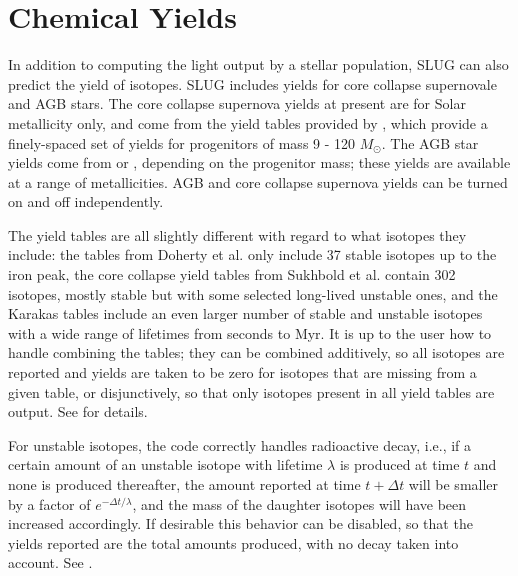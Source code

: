 \documentclass[letterpaper,10pt,english]{sphinxmanual}
\begin{document}
\section{Chemical Yields}
\label{\detokenize{intro:ssec-yields}}\label{\detokenize{intro:chemical-yields}}
In addition to computing the light output by a stellar population,
SLUG can also predict the yield of isotopes. SLUG includes yields for
core collapse supernovale and AGB stars. The core collapse supernova
yields at present are for Solar metallicity only, and come from the
yield tables provided by , which provide a
finely-spaced set of yields for progenitors of mass 9 - 120
\(M_\odot\). The AGB star yields come from  or
, depending
on the progenitor mass; these yields are available at a range of
metallicities. AGB and core collapse supernova yields can be
turned on and off independently.

The yield tables are all slightly different with regard to what
isotopes they include: the tables from Doherty et al. only include 37
stable isotopes up to the iron peak, the core collapse yield tables
from Sukhbold et al. contain 302 isotopes, mostly stable but with some
selected long-lived unstable ones, and the Karakas tables include an
even larger number of stable and unstable isotopes with a wide range
of lifetimes from seconds to Myr. It is up to the user how to handle
combining the tables; they can be combined additively, so all isotopes
are reported and yields are taken to be zero for isotopes that are
missing from a given table, or disjunctively, so that only isotopes
present in all yield tables are output. See {\hyperref[\detokenize{parameters:sec-parameters}]{}} for
details.

For unstable isotopes, the code correctly handles radioactive decay,
i.e., if a certain amount of an unstable isotope with lifetime
\(\lambda\) is produced at time \(t\) and none is produced
thereafter, the amount reported at time \(t+\Delta t\) will be
smaller by a factor of \(e^{-\Delta t/\lambda}\), and the mass of
the daughter isotopes will have been increased accordingly. If
desirable this behavior can be disabled, so that the yields
reported are the total amounts produced, with no decay taken
into account. See {\hyperref[\detokenize{parameters:sec-parameters}]{}}.
\end{document}

